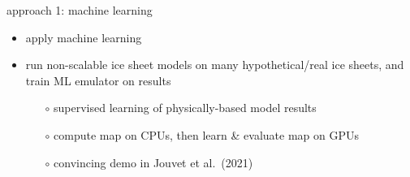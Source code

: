 \documentclass[svgnames,
               hyperref={colorlinks,citecolor=DeepPink4,linkcolor=FireBrick,urlcolor=Maroon},
               usepdftitle=false]  %
               {beamer}
\begin{document}
\begin{frame}{approach 1: machine learning}

\begin{itemize}
\item apply \alert{machine learning}
\item run non-scalable ice sheet models on many hypothetical/real ice sheets, and train ML \alert{emulator} on results
    \begin{itemize}
    \item[$\circ$] supervised learning of physically-based model results
    \item[$\circ$] compute map on CPUs, then learn \& evaluate map on GPUs
    \item[$\circ$] convincing demo in Jouvet et al.~(2021)
    \end{itemize}
\end{itemize}

\vspace{3mm}
\begin{minipage}[t][60cm][t]{\textwidth}
\begin{center}
\end{center}
\end{minipage}
\end{frame}
\end{document}
